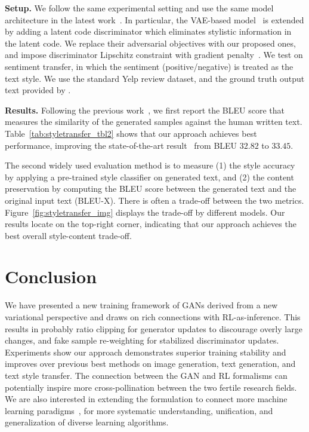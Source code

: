\documentclass{article}
\newcommand{\0}{\bm{0}}
\begin{document}
\textbf{Setup.} We follow the same experimental setting and use the same model architecture in the latest work~\cite{tikhonov2019style}. In particular, the VAE-based model~\cite{hu2017toward,kingma2013auto} is extended by adding a latent code discriminator which eliminates stylistic information in the latent code. We replace their adversarial objectives with our proposed ones, and impose discriminator Lipschitz constraint with gradient penalty~\cite{wgangp}. 
We test on sentiment transfer, in which the sentiment (positive/negative) is treated as the text style. We use the standard Yelp review dataset,
and the ground truth output text provided by \cite{li2018delete}.


\textbf{Results.} Following the previous work~\cite{tikhonov2019style}, we first report the BLEU score that measures the similarity of the generated samples against the human written text. Table~\ref{tab:styletransfer_tbl2} shows that our approach achieves best performance, improving the state-of-the-art result~\cite{tikhonov2019style} from BLEU $32.82$ to $33.45$.

The second widely used evaluation method is to measure (1) the style accuracy by applying a pre-trained style classifier on generated text, and (2) the content preservation by computing the BLEU score between the generated text and the original input text (BLEU-X). There is often a trade-off between the two metrics. Figure~\ref{fig:styletransfer_img} displays the trade-off by different models. Our results locate on the top-right corner, indicating that our approach achieves the best overall style-content trade-off.


























\section{Conclusion}\label{sec:conclusion}
We have presented a new training framework of GANs derived from a new variational perspective and draws on rich connections with RL-as-inference. This results in probably ratio clipping for generator updates to discourage overly large changes, and fake sample re-weighting for stabilized discriminator updates. Experiments show our approach demonstrates superior training stability and improves over previous best methods on image generation, text generation, and text style transfer. 
The connection between the GAN and RL formalisms can potentially inspire more cross-pollination between the two fertile research fields. We are also interested in extending the formulation to connect more machine learning paradigms~\citep{hu2020learning}, for more systematic understanding, unification, and generalization of diverse learning algorithms.
\end{document}
